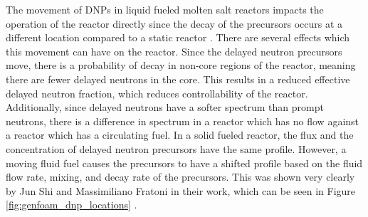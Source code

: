 The movement of DNPs in liquid fueled molten salt reactors impacts the operation of the reactor directly since the decay of the precursors occurs at a different location compared to a static reactor \cite{wooten_review_2018, aufiero_calculating_2014}. There are several effects which this movement can have on the reactor. Since the delayed neutron precursors move, there is a probability of decay in non-core regions of the reactor, meaning there are fewer delayed neutrons in the core. This results in a reduced effective delayed neutron fraction, which reduces controllability of the reactor. Additionally, since delayed neutrons have a softer spectrum than prompt neutrons, there is a difference in spectrum in a reactor which has no flow against a reactor which has a circulating fuel.
In a solid fueled reactor, the flux and the concentration of delayed neutron precursors have the same profile. However, a moving fluid fuel causes the precursors to have a shifted profile based on the fluid flow rate, mixing, and decay rate of the precursors. This was shown very clearly by Jun Shi and Massimiliano Fratoni in their work, which can be seen in Figure \ref{fig:genfoam_dnp_locations} \cite{shi_gen-foam_2021}. 

